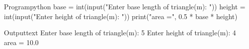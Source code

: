 \documentclass[11pt]{ipu-python}
\begin{document}
    \\~\\
    \begin{code}
        {Program}{python}
base = int(input("Enter base length of triangle(m): "))
height = int(input("Enter height of triangle(m): "))
print("area =", 0.5 * base * height)
    \end{code}
    \begin{code}
        {Output}{text}
Enter base length of triangle(m): 5
Enter height of triangle(m): 4
area = 10.0
    \end{code}
    \newpage

\end{document}
